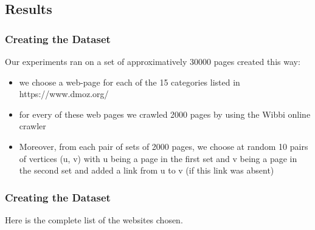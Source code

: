 \documentclass{beamer}
\begin{document}
\subsection{Results}
\begin{frame}
\frametitle{Creating the Dataset}
Our experiments ran on a set of approximatively 30000 pages created this way:
\begin{itemize}
	\item we choose a web-page for each of the 15 categories listed in https://www.dmoz.org/
	\item for every of these web pages we crawled 2000 pages by using the Wibbi online crawler
	\item Moreover, from each pair of sets of 2000 pages, we choose at random 10 pairs of vertices (u, v) with u being a page in the first set and v being a page in the second set and added a link from u to v (if this link was absent)
\end{itemize}
\end{frame}

\begin{frame}
\frametitle{Creating the Dataset}
Here is the complete list of the websites chosen.
\begin{table}[]
	\centering
\end{table}
\end{frame}
\end{document}
